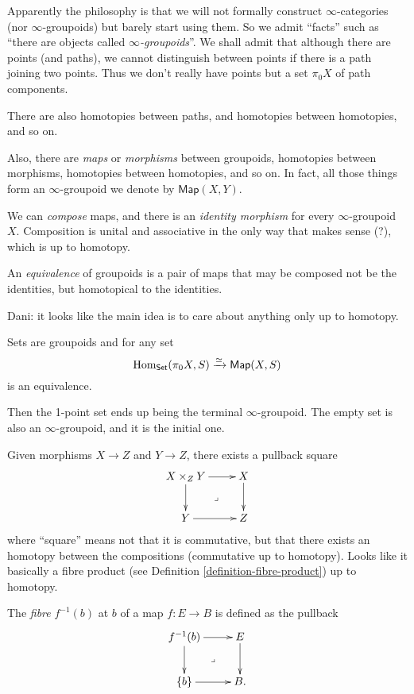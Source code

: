 Apparently the philosophy is that
we will not formally construct $\infty$-categories
(nor $\infty$-groupoids) but
barely start using them.
So we admit ``facts'' such as
``there are objects called {\it$\infty$-groupoids}''.
We shall admit that although there are points (and paths),
we cannot distinguish between points if there is
a path joining two points. Thus we don't really have points
but a set $\pi_0X$ of path components.

There are also homotopies between
paths, and homotopies between homotopies, and so on.

Also, there are {\it maps} or {\it morphisms} between groupoids,
homotopies between morphisms, homotopies between homotopies,
and so on. In fact, all those things form an $\infty$-groupoid
we denote by $\mathsf{Map}(X,Y)$.

We can {\it compose} maps, and there is
an {\it identity morphism} for every $\infty$-groupoid $X$.
Composition is unital and associative in the only
way that makes sense (?), which is up to homotopy.

\begin{definition}
\label{definition-equivalence}
An {\it equivalence} of groupoids is a pair of maps
that may be composed not be the identities,
but homotopical to the identities.
\end{definition}

Dani: it looks like the main idea
is to care about anything only up to homotopy.

\medskip\noindent
Sets are groupoids and for any set
$$
\mathop{\mathrm{Hom}}\nolimits_{\mathsf{Set}}(\pi_0X,S)\xrightarrow{\simeq }\mathsf{Map}(X,S)
$$
is an equivalence.

Then the 1-point set ends up being
the terminal $\infty$-groupoid. The empty set
is also an $\infty$-groupoid, and it is
the initial one.

\medskip\noindent
Given morphisms $X \to Z$ and $Y \to Z$,
there exists a pullback square
$$
\xymatrix{
X\times_Z Y\ar[r]\ar[d]\ar@{}[dr]|-{\lrcorner}&X\ar[d]\\
Y\ar[r]&Z
}
$$
where ``square'' means not that it is commutative,
but that there exists an homotopy between
the compositions (commutative up to homotopy).
Looks like it basically a fibre product
(see Definition \ref{definition-fibre-product})
up to homotopy.

The {\it fibre} $f^{-1}(b)$ at $b$ of a map
$f:E\to B$ is defined as the pullback
$$
\xymatrix{
f^{-1}(b)\ar[r]\ar[d]\ar@{}[dr]|-{\lrcorner}&E\ar[d]\\
\{b\}\ar[r]&B.
}
$$

